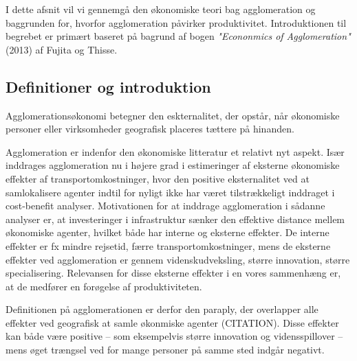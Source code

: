 
I dette afsnit vil vi gennemgå den økonomiske teori bag agglomeration og baggrunden for, hvorfor agglomeration påvirker produktivitet. Introduktionen til begrebet er primært baseret på bagrund af bogen \emph{"Econonmics of Agglomeration"} (2013) af Fujita og Thisse.

\subsection{Definitioner og introduktion}
Agglomerationsøkonomi betegner den eskternalitet, der opstår, når økonomiske personer eller virksomheder geografisk placeres tættere på hinanden. 

Agglomeration er indenfor den økonomiske litteratur et relativt nyt aspekt. Især inddrages agglomeration nu i højere grad i estimeringer af eksterne økonomiske effekter af transportomkostninger, hvor den positive eksternalitet ved at samlokalisere agenter indtil for nyligt ikke har været tilstrækkeligt inddraget i cost-benefit analyser.
%
Motivationen for at inddrage agglomeration i sådanne analyser er, at investeringer i infrastruktur sænker den effektive distance mellem økonomiske agenter, hvilket både har interne og eksterne effekter. De interne effekter er fx mindre rejsetid, færre transportomkostninger, mens de eksterne effekter ved agglomeration er gennem videnskudveksling, større innovation, større specialisering. Relevansen for disse eksterne effekter i en vores sammenhæng er, at de medfører en forøgelse af produktiviteten.

Definitionen på agglomerationen er derfor den paraply, der overlapper alle effekter ved geografisk at samle økonmiske agenter (CITATION). Disse effekter kan både være positive -- som eksempelvis større innovation og vidensspillover -- mens øget trængsel ved for mange personer på samme sted indgår negativt.



